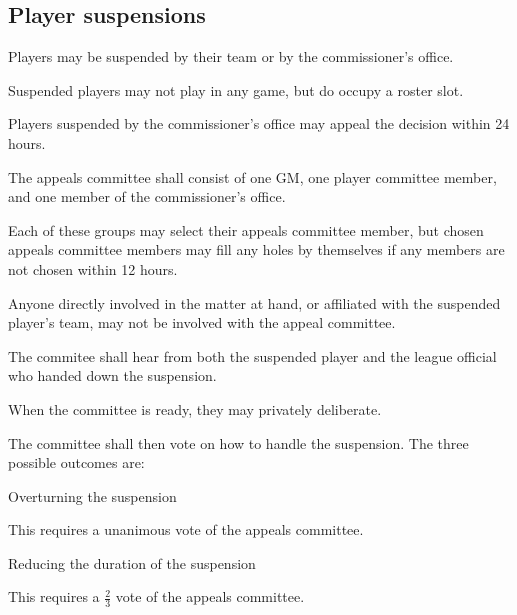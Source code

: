 \subsection{Player suspensions}
\begin{deepEnumerate}
	\item Players may be suspended by their team or by the commissioner’s office.
	\begin{deepEnumerate}
		\item Suspended players may not play in any game, but do occupy a roster slot.
	\end{deepEnumerate}
	\item Players suspended by the commissioner’s office may appeal the decision within 24 hours.
	\begin{deepEnumerate}
		\item The appeals committee shall consist of 
		one GM, one player committee member, and one member of the commissioner’s office.
		\begin{deepEnumerate}
			\item Each of these groups may select their appeals committee member,
			but chosen appeals committee members may fill any holes by themselves
			if any members are not chosen within 12 hours.
			\item Anyone directly involved in the matter at hand,
			or affiliated with the suspended player's team,
			may not be involved with the appeal committee.
		\end{deepEnumerate}
		\item The commitee shall hear from both the suspended player
		and the league official who handed down the suspension.
		\item When the committee is ready, they may privately deliberate.
		\item The committee shall then vote on how to handle the suspension.
		The three possible outcomes are:
		\begin{deepEnumerate}
			\item Overturning the suspension
			\begin{deepEnumerate}
				\item This requires a unanimous vote of the appeals committee.
			\end{deepEnumerate}
			\item Reducing the duration of the suspension
			\begin{deepEnumerate}
				\item This requires a $\frac{2}{3}$ vote of the appeals committee.

\end{deepEnumerate}
\end{deepEnumerate}
\end{deepEnumerate}
\end{deepEnumerate}
